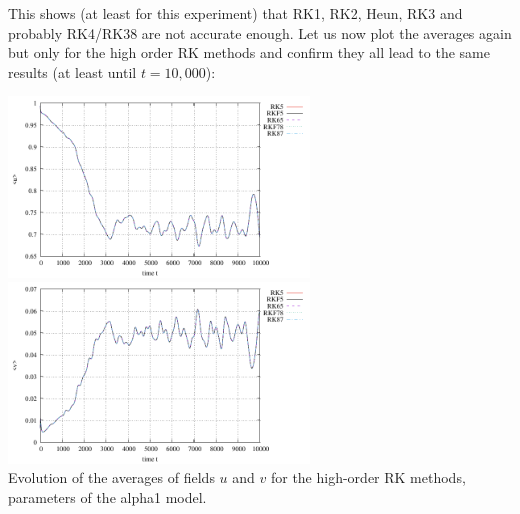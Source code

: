 This shows (at least for this experiment) that RK1, RK2, Heun, RK3 and probably RK4/RK38
are not accurate enough. Let us now plot the averages again but only for the high
order RK methods and confirm they all lead to the same results (at least until $t=10,000$):

\begin{center}
\includegraphics[width=8cm]{python_codes/fieldstone_171/RKtest2/avrg_u_high.pdf}
\includegraphics[width=8cm]{python_codes/fieldstone_171/RKtest2/avrg_v_high.pdf}\\
{\captionfont Evolution of the averages of fields $u$
and $v$ for the high-order RK methods, parameters of the alpha1 model.}
\end{center}


